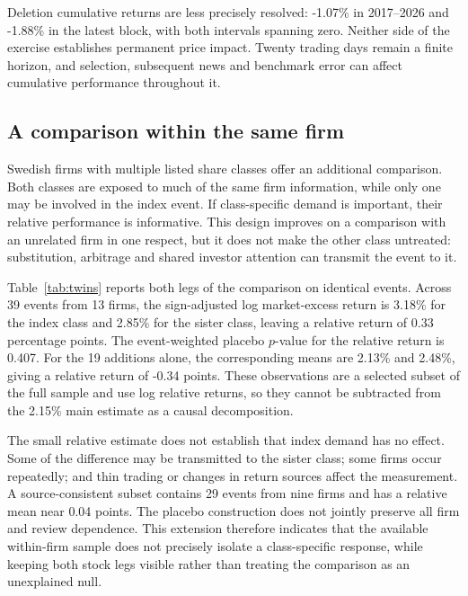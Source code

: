 Deletion cumulative returns are less precisely resolved: -1.07\% in 2017--2026 and -1.88\% in the latest block, with both intervals spanning zero. Neither side of the exercise establishes permanent price impact. Twenty trading days remain a finite horizon, and selection, subsequent news and benchmark error can affect cumulative performance throughout it.

\subsection{A comparison within the same firm}

Swedish firms with multiple listed share classes offer an additional comparison. Both classes are exposed to much of the same firm information, while only one may be involved in the index event. If class-specific demand is important, their relative performance is informative. This design improves on a comparison with an unrelated firm in one respect, but it does not make the other class untreated: substitution, arbitrage and shared investor attention can transmit the event to it.



Table~\ref{tab:twins} reports both legs of the comparison on identical events. Across 39 events from 13 firms, the sign-adjusted log market-excess return is 3.18\% for the index class and 2.85\% for the sister class, leaving a relative return of 0.33 percentage points. The event-weighted placebo $p$-value for the relative return is 0.407. For the 19 additions alone, the corresponding means are 2.13\% and 2.48\%, giving a relative return of -0.34 points. These observations are a selected subset of the full sample and use log relative returns, so they cannot be subtracted from the 2.15\% main estimate as a causal decomposition.

The small relative estimate does not establish that index demand has no effect. Some of the difference may be transmitted to the sister class; some firms occur repeatedly; and thin trading or changes in return sources affect the measurement. A source-consistent subset contains 29 events from nine firms and has a relative mean near 0.04 points. The placebo construction does not jointly preserve all firm and review dependence. This extension therefore indicates that the available within-firm sample does not precisely isolate a class-specific response, while keeping both stock legs visible rather than treating the comparison as an unexplained null.

